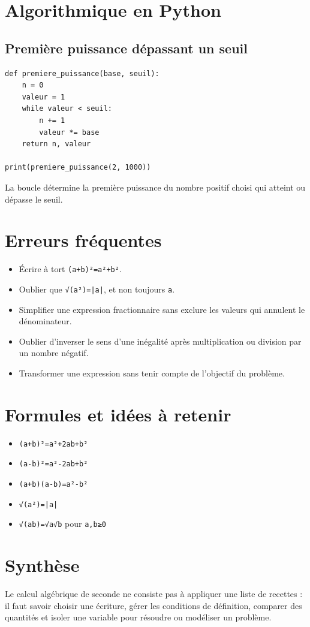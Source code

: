 \section{Algorithmique en Python}

\subsection{Première puissance dépassant un seuil}

\begin{verbatim}
def premiere_puissance(base, seuil):
    n = 0
    valeur = 1
    while valeur < seuil:
        n += 1
        valeur *= base
    return n, valeur

print(premiere_puissance(2, 1000))
\end{verbatim}

La boucle détermine la première puissance du nombre positif choisi qui atteint ou dépasse le seuil.

\section{Erreurs fréquentes}

\begin{itemize}
\item Écrire à tort \texttt{(a+b)²=a²+b²}.
\item Oublier que \texttt{√(a²)=|a|}, et non toujours \texttt{a}.
\item Simplifier une expression fractionnaire sans exclure les valeurs qui annulent le dénominateur.
\item Oublier d'inverser le sens d'une inégalité après multiplication ou division par un nombre négatif.
\item Transformer une expression sans tenir compte de l'objectif du problème.
\end{itemize}

\section{Formules et idées à retenir}

\begin{itemize}
\item \texttt{(a+b)²=a²+2ab+b²}
\item \texttt{(a-b)²=a²-2ab+b²}
\item \texttt{(a+b)(a-b)=a²-b²}
\item \texttt{√(a²)=|a|}
\item \texttt{√(ab)=√a√b} pour \texttt{a,b≥0}
\end{itemize}

\section{Synthèse}

Le calcul algébrique de seconde ne consiste pas à appliquer une liste de recettes : il faut savoir choisir une écriture, gérer les conditions de définition, comparer des quantités et isoler une variable pour résoudre ou modéliser un problème.
